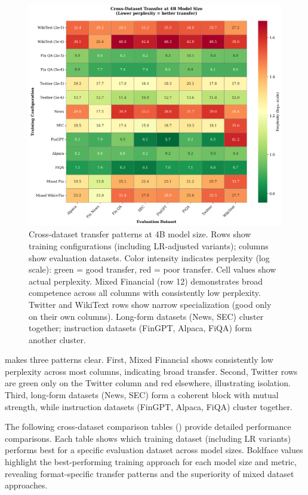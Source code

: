 \begin{figure}[h]
\centering
\includegraphics[width=\textwidth]{figures/heatmap_transfer.png}
\caption[Cross-Dataset Transfer Heatmap]{Cross-dataset transfer patterns at 4B model size. Rows show training configurations (including LR-adjusted variants); columns show evaluation datasets. Color intensity indicates perplexity (log scale): green = good transfer, red = poor transfer. Cell values show actual perplexity. Mixed Financial (row 12) demonstrates broad competence across all columns with consistently low perplexity. Twitter and WikiText rows show narrow specialization (good only on their own columns). Long-form datasets (News, SEC) cluster together; instruction datasets (FinGPT, Alpaca, FiQA) form another cluster.}
\label{fig:heatmap_transfer}
\end{figure}

 makes three patterns clear. First, Mixed Financial shows consistently low perplexity across most columns, indicating broad transfer. Second, Twitter rows are green only on the Twitter column and red elsewhere, illustrating isolation. Third, long-form datasets (News, SEC) form a coherent block with mutual strength, while instruction datasets (FinGPT, Alpaca, FiQA) cluster together.

The following cross-dataset comparison tables () provide detailed performance comparisons. Each table shows which training dataset (including LR variants) performs best for a specific evaluation dataset across model sizes. Boldface values highlight the best-performing training approach for each model size and metric, revealing format-specific transfer patterns and the superiority of mixed dataset approaches.


